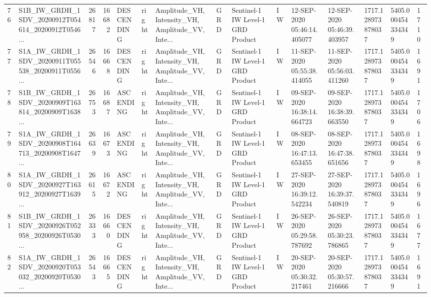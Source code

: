 \begin{tabular}{llrrlllllllllll}
76  &  S1B\_IW\_GRDH\_1SDV\_20200912T054614\_20200912T0546... &  26817 &   16682 &  DESCENDING &  right &  Amplitude\_VH, Intensity\_VH, Amplitude\_VV, Inte... &          GRD &  Sentinel-1 IW Level-1 GRD Product &              IW &  12-SEP-2020 05:46:14.405077 &  12-SEP-2020 05:46:39.403957 &          1717.128973878037 &  5405.000454334349 &       1710 \\
77  &  S1A\_IW\_GRDH\_1SDV\_20200911T055538\_20200911T0556... &  26546 &   16668 &  DESCENDING &  right &  Amplitude\_VH, Intensity\_VH, Amplitude\_VV, Inte... &          GRD &  Sentinel-1 IW Level-1 GRD Product &              IW &  11-SEP-2020 05:55:38.414055 &  11-SEP-2020 05:56:03.411260 &          1717.128973878037 &  5405.000454334349 &       1691 \\
78  &  S1B\_IW\_GRDH\_1SDV\_20200909T163814\_20200909T1638... &  26753 &   16687 &   ASCENDING &  right &  Amplitude\_VH, Intensity\_VH, Amplitude\_VV, Inte... &          GRD &  Sentinel-1 IW Level-1 GRD Product &              IW &  09-SEP-2020 16:38:14.664723 &  09-SEP-2020 16:38:39.663550 &          1717.128973878037 &  5405.000454334349 &       1706 \\
79  &  S1A\_IW\_GRDH\_1SDV\_20200908T164713\_20200908T1647... &  26639 &   16673 &   ASCENDING &  right &  Amplitude\_VH, Intensity\_VH, Amplitude\_VV, Inte... &          GRD &  Sentinel-1 IW Level-1 GRD Product &              IW &  08-SEP-2020 16:47:13.653455 &  08-SEP-2020 16:47:38.651656 &          1717.128973878037 &  5405.000454334349 &       1698 \\
80  &  S1A\_IW\_GRDH\_1SDV\_20200927T163912\_20200927T1639... &  26615 &   16672 &   ASCENDING &  right &  Amplitude\_VH, Intensity\_VH, Amplitude\_VV, Inte... &          GRD &  Sentinel-1 IW Level-1 GRD Product &              IW &  27-SEP-2020 16:39:12.542234 &  27-SEP-2020 16:39:37.540819 &          1717.128973878037 &  5405.000454334349 &       1696 \\
81  &  S1B\_IW\_GRDH\_1SDV\_20200926T052958\_20200926T0530... &  26333 &   16660 &  DESCENDING &  right &  Amplitude\_VH, Intensity\_VH, Amplitude\_VV, Inte... &          GRD &  Sentinel-1 IW Level-1 GRD Product &              IW &  26-SEP-2020 05:29:58.787692 &  26-SEP-2020 05:30:23.786865 &          1717.128973878037 &  5405.000454334349 &       1677 \\
82  &  S1A\_IW\_GRDH\_1SDV\_20200920T053032\_20200920T0530... &  26543 &   16665 &  DESCENDING &  right &  Amplitude\_VH, Intensity\_VH, Amplitude\_VV, Inte... &          GRD &  Sentinel-1 IW Level-1 GRD Product &              IW &  20-SEP-2020 05:30:32.217461 &  20-SEP-2020 05:30:57.216666 &          1717.128973878037 &  5405.000454334349 &       1691 \\

\end{tabular}
